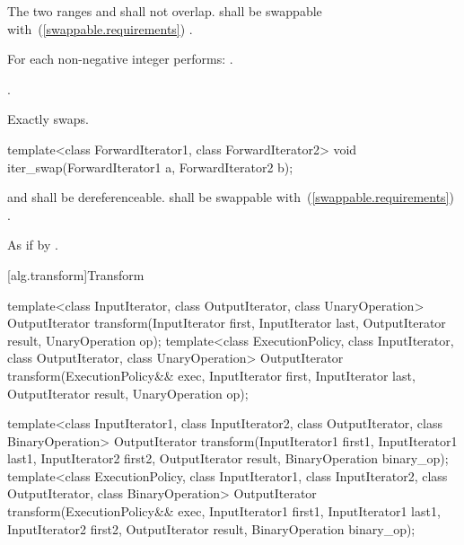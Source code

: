 \begin{itemdescr}
\pnum
\requires
The two ranges 
and
shall not overlap.
 shall be swappable with~(\ref{swappable.requirements})
.

\pnum
\effects
For each non-negative integer
performs:
.

\pnum
\returns
{}.

\pnum
\complexity
Exactly
swaps.
\end{itemdescr}

%
\begin{itemdecl}
template<class ForwardIterator1, class ForwardIterator2>
  void iter_swap(ForwardIterator1 a, ForwardIterator2 b);
\end{itemdecl}

\begin{itemdescr}
\pnum
\requires
{} and  shall be dereferenceable.  shall be
swappable with~(\ref{swappable.requirements}) .

\pnum
\effects
As if by .
\end{itemdescr}

[alg.transform]{Transform}

%
\begin{itemdecl}
template<class InputIterator, class OutputIterator,
         class UnaryOperation>
  OutputIterator
    transform(InputIterator first, InputIterator last,
              OutputIterator result, UnaryOperation op);
template<class ExecutionPolicy, class InputIterator, class OutputIterator,
         class UnaryOperation>
  OutputIterator
    transform(ExecutionPolicy&& exec,
              InputIterator first, InputIterator last,
              OutputIterator result, UnaryOperation op);

template<class InputIterator1, class InputIterator2,
         class OutputIterator, class BinaryOperation>
  OutputIterator
    transform(InputIterator1 first1, InputIterator1 last1,
              InputIterator2 first2, OutputIterator result,
              BinaryOperation binary_op);
template<class ExecutionPolicy, class InputIterator1, class InputIterator2,
         class OutputIterator, class BinaryOperation>
  OutputIterator
    transform(ExecutionPolicy&& exec,
              InputIterator1 first1, InputIterator1 last1,
              InputIterator2 first2, OutputIterator result,
              BinaryOperation binary_op);
\end{itemdecl}

